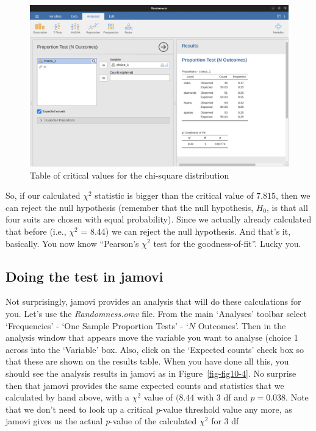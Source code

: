 \documentclass[
  a4paper,
]{book}
\begin{document}
\begin{figure}

\includegraphics[width=1\textwidth,height=\textheight]{images/fig10-3.png} \hfill{}

\caption{\label{fig-fig10-3}Table of critical values for the chi-square
distribution}

\end{figure}

So, if our calculated \(\chi^2\) statistic is bigger than the critical
value of \(7.815\), then we can reject the null hypothesis (remember
that the null hypothesis, \(H_0\), is that all four suits are chosen
with equal probability). Since we actually already calculated that
before (i.e., \(\chi^2\) = 8.44) we can reject the null hypothesis. And
that's it, basically. You now know ``Pearson's \(\chi^2\) test for the
goodness-of-fit''. Lucky you.

\hypertarget{doing-the-test-in-jamovi}{%
\subsection{Doing the test in jamovi}\label{doing-the-test-in-jamovi}}

Not surprisingly, jamovi provides an analysis that will do these
calculations for you. Let's use the \emph{Randomness.omv} file. From the
main `Analyses' toolbar select `Frequencies' - `One Sample Proportion
Tests' - `\(N\) Outcomes'. Then in the analysis window that appears move
the variable you want to analyse (choice 1 across into the `Variable'
box. Also, click on the `Expected counts' check box so that these are
shown on the results table. When you have done all this, you should see
the analysis results in jamovi as in Figure~\ref{fig-fig10-4}. No
surprise then that jamovi provides the same expected counts and
statistics that we calculated by hand above, with a \(\chi^2\) value of
\((8.44\) with \(3\) df and \(p=0.038\). Note that we don't need to look
up a critical \emph{p}-value threshold value any more, as jamovi gives
us the actual \emph{p}-value of the calculated \(\chi^2\) for \(3\) df
\end{document}
